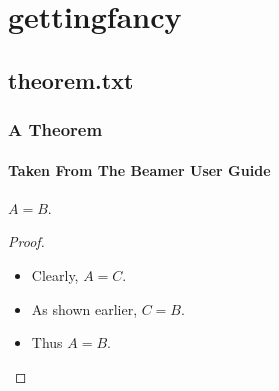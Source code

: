 \documentclass[10pt]{beamer}
\begin{document}
\section{gettingfancy}
\subsection{theorem.txt}

\begin{frame}[<+->]
	\frametitle{A Theorem}
	\framesubtitle{Taken From The Beamer User Guide}

	\begin{theorem}
		$A = B$.
	\end{theorem}
	\begin{proof}
		\begin{itemize}
		\item Clearly, $A = C$.
		\item As shown earlier, $C = B$.
		\item<3-> Thus $A = B$.
		\end{itemize}
	\end{proof}
\end{frame}
\end{document}
